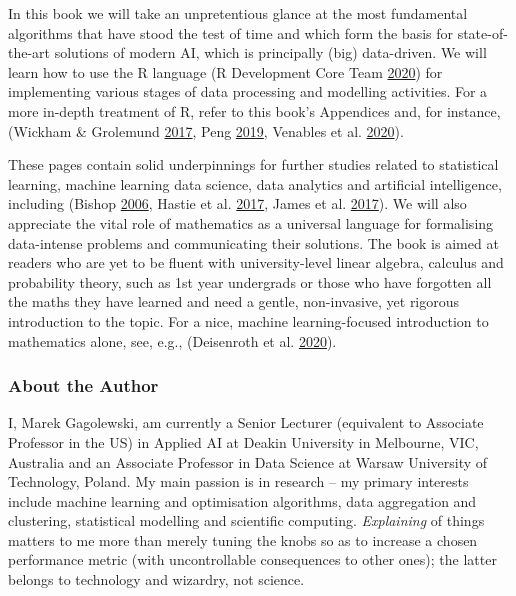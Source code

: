 \documentclass[10pt,b5paper,krantz1]{krantz}
\begin{document}
In this book we will take an unpretentious glance at the most fundamental
algorithms that have stood the test of time and which form
the basis for state-of-the-art solutions of modern AI,
which is principally (big) data-driven.
We will learn how to use the R language (R Development Core Team \protect\hyperlink{ref-rpoject}{2020})
for implementing various stages
of data processing and modelling activities.
For a more in-depth treatment of R, refer to this book's Appendices
and, for instance, (Wickham \& Grolemund \protect\hyperlink{ref-r4ds}{2017}, Peng \protect\hyperlink{ref-rprogdatascience}{2019}, Venables et al. \protect\hyperlink{ref-Rintro}{2020}).

These pages contain solid underpinnings for further studies
related to statistical learning, machine learning
data science, data analytics and artificial intelligence,
including (Bishop \protect\hyperlink{ref-bishop}{2006}, Hastie et al. \protect\hyperlink{ref-esl}{2017}, James et al. \protect\hyperlink{ref-islr}{2017}).
We will also appreciate the vital role of mathematics as a universal
language for formalising data-intense problems and communicating their
solutions. The book is aimed at readers who are yet to be fluent with
university-level linear algebra, calculus and probability theory,
such as 1st year undergrads or those who have forgotten
all the maths they have learned and need a gentle, non-invasive,
yet rigorous introduction to the topic.
For a nice, machine learning-focused introduction to mathematics alone,
see, e.g., (Deisenroth et al. \protect\hyperlink{ref-mml}{2020}).

\hypertarget{about-the-author}{%
\subsubsection*{About the Author}\label{about-the-author}}


I, Marek Gagolewski, am currently a Senior Lecturer (equivalent to Associate Professor in the US)
in Applied AI at Deakin University in Melbourne, VIC, Australia
and an Associate Professor in Data Science at Warsaw University of Technology,
Poland. My main passion is in research -- my primary interests include
machine learning and optimisation algorithms, data aggregation and clustering,
statistical modelling and scientific computing.
\emph{Explaining} of things matters to me more than merely tuning the knobs
so as to increase a chosen performance metric (with uncontrollable consequences
to other ones); the latter belongs to technology and wizardry,
not science.
\end{document}
